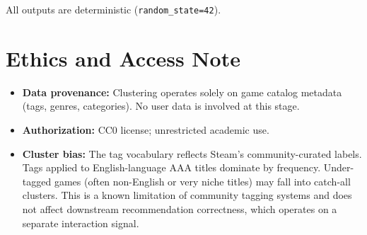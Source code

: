 \documentclass[11pt,a4paper]{article}
\begin{document}
All outputs are deterministic (\texttt{random\_state=42}).

\section{Ethics and Access Note}

\begin{itemize}[leftmargin=*]
  \item \textbf{Data provenance:} Clustering operates solely on game catalog metadata (tags, genres, categories). No user data is involved at this stage.
  \item \textbf{Authorization:} CC0 license; unrestricted academic use.
  \item \textbf{Cluster bias:} The tag vocabulary reflects Steam's community-curated labels. Tags applied to English-language AAA titles dominate by frequency. Under-tagged games (often non-English or very niche titles) may fall into catch-all clusters. This is a known limitation of community tagging systems and does not affect downstream recommendation correctness, which operates on a separate interaction signal.
\end{itemize}
\end{document}
